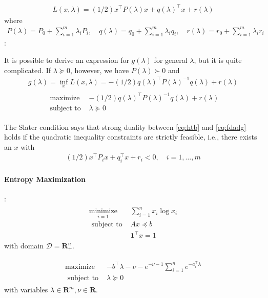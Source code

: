 \documentclass{article}
\begin{document}
\begin{align*}
L(x, \lambda)=(1 / 2) x^{\top} P(\lambda) x+q(\lambda)^{\top} x+r(\lambda)
\end{align*}
where
\begin{align*}
P(\lambda)=P_{0}+\sum_{i=1}^{m} \lambda_{i} P_{i}, \quad q(\lambda)=q_{0}+\sum_{i=1}^{m} \lambda_{i} q_{i}, \quad r(\lambda)=r_{0}+\sum_{i=1}^{m} \lambda_{i} r_{i}
\end{align*}
:

It is possible to derive an expression for $g(\lambda)$ for general $\lambda$, but it is quite complicated. If $\lambda \succeq 0$, however, we have $P(\lambda) \succ 0$ and
\begin{align*}
g(\lambda)=\inf _{x} L(x, \lambda)=-(1 / 2) q(\lambda)^{\top} P(\lambda)^{-1} q(\lambda)+r(\lambda)
\end{align*}
\begin{align}
\begin{array}{ll}
\text { maximize } & -(1 / 2) q(\lambda)^{\top} P(\lambda)^{-1} q(\lambda)+r(\lambda) \\
\text { subject to } & \lambda \succeq 0
\end{array}\label{eq:fdadg}
\end{align}

The Slater condition says that strong duality between \cref{eq:htb} and \cref{eq:fdadg} holds if the quadratic inequality constraints are strictly feasible, i.e., there exists an $x$ with
\begin{align*}
(1 / 2) x^{\top} P_{i} x+q_{i}^{\top} x+r_{i}<0, \quad i=1, \ldots, m
\end{align*}
\paragraph{Entropy Maximization}
:
\begin{align*}
\begin{array}{ll}
\underset{i=1}{\operatorname{minimize}} & \sum_{i=1}^{n} x_{i} \log x_{i} \\
\text { subject to } & A x \preceq b \\
& \mathbf{1}^{\top} x=1
\end{array}
\end{align*}
with domain $\mathcal{D}=\mathbf{R}_{+}^{n}$. 

\begin{align}
\begin{array}{ll}
\operatorname{maximize} & -b^{\top} \lambda-\nu-e^{-\nu-1} \sum_{i=1}^{n} e^{-a_{i}^{\top} \lambda} \\
\text { subject to } & \lambda \succeq 0
\end{array}\label{eq:hugrgra}
\end{align}
with variables $\lambda \in \mathbf{R}^{m}, \nu \in \mathbf{R}$. 
\end{document}
